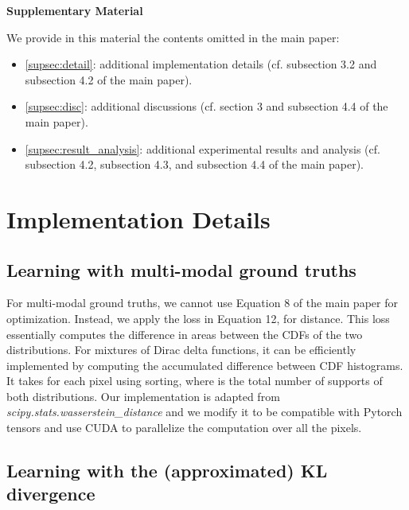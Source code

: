 \documentclass{article}
\begin{document}



\newpage
\appendix
\begin{center}
	\textbf{\Large Supplementary Material}
\end{center}





We provide in this material the contents omitted in the main paper:
\begin{itemize}
    \item \autoref{supsec:detail}: additional implementation details (cf. subsection 3.2 and subsection 4.2 of the main paper).
    \item \autoref{supsec:disc}: additional discussions  (cf. section 3 and subsection 4.4 of the main paper).
    \item \autoref{supsec:result_analysis}: additional experimental results and analysis (cf. subsection 4.2, subsection 4.3, and subsection 4.4 of the main paper).
\end{itemize}



\section{Implementation Details}
\label{supsec:detail}

\subsection{Learning with multi-modal ground truths}

For multi-modal ground truths, we cannot use Equation 8 of the main paper for optimization. Instead, we apply the loss in Equation 12, for  distance.
This loss essentially computes the difference in areas between the CDFs of the two distributions. For mixtures of Dirac delta functions, it can be efficiently implemented by computing the accumulated difference between CDF histograms. It takes  for each pixel using sorting, where  is the total number of supports of both distributions. 
Our implementation is adapted from \emph{scipy.stats.wasserstein\_distance} and we modify it to be compatible with Pytorch tensors and use CUDA to parallelize the computation over all the pixels.


\subsection{Learning with the (approximated) KL divergence}
\label{supssec:kl_divergence}
\end{document}
